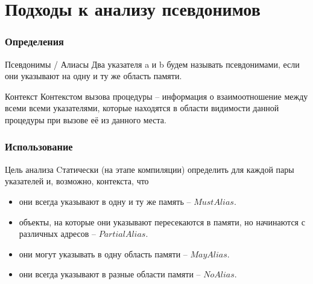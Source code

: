 \documentclass[utf8,russian]{beamer}
\begin{document}
\section{Подходы к анализу псевдонимов}

\begin{frame}
\frametitle{Определения}

\begin{block}{Псевдонимы / Алиасы}
Два указателя a и b будем называть псевдонимами, если они указывают на одну и ту же область памяти.
\end{block}

\begin{block}{Контекст}
Контекстом вызова процедуры -- информация о взаимоотношение между всеми всеми указателями, которые находятся в области видимости данной процедуры при вызове её из данного места.
\end{block}

\end{frame}


\begin{frame}
\frametitle{Использование}

\begin{block}{Цель анализа}
Cтатически (на этапе компиляции) определить для каждой пары указателей и, возможно, контекста, что
\begin{itemize}
\item они всегда указывают в одну и ту же память -- $MustAlias$.
\item объекты, на которые они указывают пересекаются в памяти, но начинаются с различных адресов -- $PartialAlias$.
\item они могут указывать в одну область памяти -- $MayAlias$.
\item они всегда указывают в разные области памяти -- $NoAlias$.
\end{itemize}
\end{block}

\end{frame}

\end{document}

